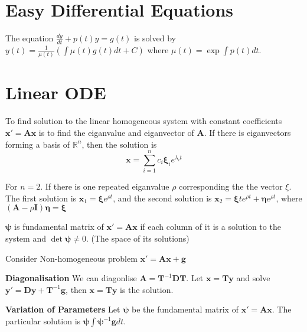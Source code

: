 \documentclass[12pt]{article}
\begin{document}
\section{Easy Differential Equations}

\begin{theorem}
	The equation $\frac{dy}{dt} + p(t)y = g(t)$ is solved by $y(t) = \frac{1}{\mu(t)} (\int \mu(t)g(t)dt+C)$ where $\mu(t) = \exp{\int p(t)dt}$.

\end{theorem}


\section{Linear ODE}

\begin{theorem}
	To find solution to the linear homogeneous system with constant coefficients $\bm{x}' = \bm{A}\bm{x}$ is to find the eiganvalue and eiganvector of $\bm{A}$.
	If there is eiganvectors forming a basis of $\mathbb{R}^n$, then the solution is
	$$ \bm{x} = \sum_{i=1}^{n} c_i \bm{\xi}_i e^{\lambda_i t} $$

	For $n=2$.
	If there is one repeated eiganvalue $\rho$ corresponding the the vector $\xi$. The first solution is $\bm{x}_1 = \bm{\xi} e^{\rho t}$, and the second solution is $\bm{x}_2 = \bm{\xi} t e^{\rho t} + \bm{\eta} e^{\rho t}$, where $(\bm{A} - \rho \bm{I}) \bm{\eta} = \bm{\xi}$
\end{theorem}

\begin{definition}
	$\bm{\psi}$ is fundamental matrix of $\bm{x}' = \bm{A}\bm{x}$ if each column of it is a solution to the system and $\det{\bm{\psi}} \neq 0$. (The space of its solutions)
\end{definition}

\begin{theorem}
	Consider Non-homogeneous problem $\bm{x}' = \bm{Ax} + \bm{g}$

\textbf{Diagonalisation}
We can diagonlise $\bm{A} = \bm{T}^{-1}\bm{DT}$. Let $\bm{x} = \bm{Ty}$ and solve $\bm{y}' = \bm{Dy} + \bm{T}^{-1}\bm{g}$, then $\bm{x} = \bm{T} \bm{y}$ is the solution.

\textbf{Variation of Parameters}
Let $\bm{\psi}$ be the fundamental matrix of $\bm{x}' = \bm{Ax}$. The particular solution is $\bm{\psi}\int \bm{\psi}^{-1}\bm{g} dt$.
\end{theorem}
\end{document}
